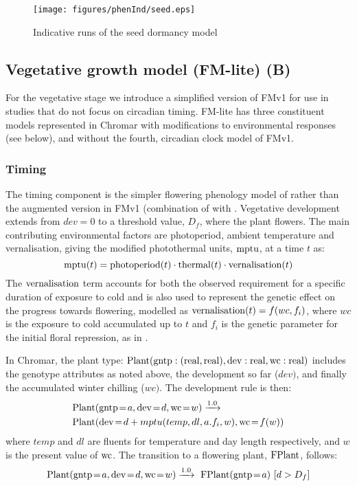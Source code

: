 \begin{figure}[tb]
  \centering
  \texttt{[image: figures/phenInd/seed.eps]}
  \caption{Indicative runs of the seed dormancy model}
  \label{fig:seedInd}
\end{figure}

\subsection{Vegetative growth model (FM-lite) (B)}
\label{vegetative-growth-model-fm-lite-b}
For the vegetative stage we introduce a simplified version of FMv1
\citep{chew_multiscale_2014} for use in studies that do not focus on circadian
timing. FM-lite has three constituent models represented in Chromar with
modifications to environmental responses (see below), and without the fourth,
circadian clock model of FMv1.

\subsubsection*{Timing}
\label{timing}

The timing component is the simpler flowering phenology model of
\citet{wilczek_effects_2009} rather than the augmented version in FMv1
(combination of \citet{chew_augmented_2012} with
\citet{salazar_prediction_2009}. Vegetative development extends from \(dev = 0\)
to a threshold value, \(D_{f}\), where the plant flowers. The main contributing
environmental factors are photoperiod, ambient temperature and vernalisation,
giving the modified photothermal units, \(\mathrm{mptu}\), at a time \(t\) as:
\[\mathrm{mptu}(t) = \mathrm{photoperiod}(t) \cdot \mathrm{thermal}(t) \cdot \mathrm{vernalisation}(t)\]
The \(\mathrm{vernalisation}\) term accounts for both the observed requirement for
a specific duration of exposure to cold and is also used to represent the
genetic effect on the progress towards flowering, modelled as
\(\mathrm{vernalisation}(t) = f(wc,f_{i})\), where $wc$ is the exposure to
cold accumulated up to \(t\) and \(f_{i}\) is the genetic parameter for the
initial floral repression, as in \citet{wilczek_effects_2009}.

In Chromar, the plant type:
\(\mathrm{Plant}(\mathrm{gntp}:(\mathrm{real},\mathrm{real}),\mathrm{dev}:\mathrm{real},\mathrm{wc}:\mathrm{real})\)
includes the genotype attributes as noted above, the development so far
(\(dev)\), and finally the accumulated winter chilling (\(wc)\). The
development rule is then:
\begin{equation*}
\begin{split}
&\mr{Plant}(\ar{gntp}{a},\ar{dev}{d}, \ar{wc}{w}) \xrightarrow{1.0} \\ 
&\mr{Plant}(\ar{dev}{d + mptu( temp, dl, a.f_{i}, w )},\ar{wc}{f(w)})
\end{split}
\end{equation*}
where $temp$ and $dl$ are fluents for temperature and day
length respectively, and $w$ is the present value of $\mathrm{wc}$. The transition to a
flowering plant, \(\mathrm{FPlant}\), follows:
$$
\mr{Plant}(\ar{gntp}{a}, \ar{dev}{d}, \ar{wc}{w}) \xrightarrow{1.0} \mr{\ FPlant}(\ar{gntp}{a}) \, \, \lbrack d > D_{f} \rbrack
$$


